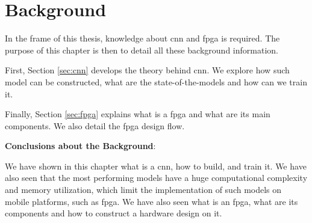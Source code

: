 \chapter{Background} \label{chap:background}
In the frame of this thesis, knowledge about \acrshort{cnn} and \acrshort{fpga} is required. The purpose of this chapter is then to detail all these background information.

First, Section \ref{sec:cnn} develops the theory behind \acrshort{cnn}. We explore how such model can be constructed, what are the state-of-the-models and how can we train it.

Finally, Section \ref{sec:fpga} explains what is a \acrshort{fpga} and what are its main components. We also detail the \acrshort{fpga} design flow.


%
\begin{tcolorbox}
    \textbf{Conclusions about the Background}:

    We have shown in this chapter what is a \acrshort{cnn}, how to build, and train it. We have also seen that the most performing models have a huge computational complexity and memory utilization, which limit the implementation of such models on mobile platforms, such as \acrshort{fpga}. We have also seen what is an \acrshort{fpga}, what are its components and how to construct a hardware design on it.
\end{tcolorbox}
% 
\afterpage{\blankpage}
\cleardoublepage
\newpage
